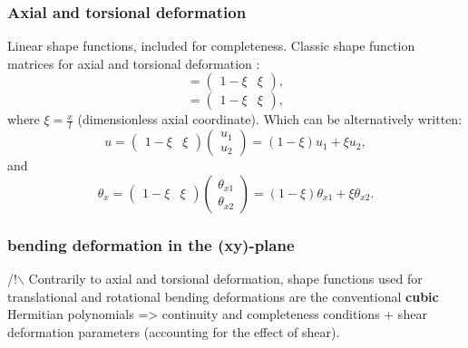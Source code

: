 \documentclass[a4paper,11pt]{article}
\begin{document}
\subsubsection*{Axial and torsional deformation}

Linear shape functions, included for completeness. Classic shape function matrices
for axial and torsional deformation :
\begin{equation}
	[ \mathcal{N}_u(\xi)] = \begin{pmatrix} 1-\xi & \xi \end{pmatrix},
\end{equation}
\begin{equation}
	[\mathcal{N}_{\theta_x}(\xi)] = \begin{pmatrix} 1-\xi & \xi \end{pmatrix},
\end{equation}
where $\xi = \frac{x}{l}$ (dimensionless axial coordinate). Which can be
alternatively written:
\begin{equation} \label{eq:u_expr}
	u = \begin{pmatrix} 1-\xi & \xi \end{pmatrix} \begin{pmatrix} u_1 \\ u_2 \end{pmatrix} = (1-\xi)u_1 + \xi u_2,
\end{equation}
and
\begin{equation} \label{eq:theta_x_expr}
	\theta_x = \begin{pmatrix} 1-\xi & \xi \end{pmatrix} \begin{pmatrix} \theta_{x1} \\ \theta_{x2} \end{pmatrix} = (1-\xi)\theta_{x1} + \xi \theta_{x2}.
\end{equation}


\subsubsection*{bending deformation in the (xy)-plane}

/!$\backslash$ Contrarily to axial and torsional deformation, shape functions used
for translational and rotational bending deformations are the conventional
\textbf{cubic} Hermitian polynomials => continuity and completeness conditions +
shear deformation parameters (accounting for the effect of shear).\\
\end{document}
